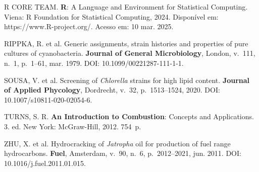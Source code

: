 R CORE TEAM. \textbf{R}: A Language and Environment for Statistical Computing. Viena: R Foundation for Statistical Computing, 2024. Disponível em: https://www.R-project.org/. Acesso em: 10 mar. 2025.

RIPPKA, R. et al. Generic assignments, strain histories and properties of pure cultures of cyanobacteria. \textbf{Journal of General Microbiology}, London, v.~111, n.~1, p.~1--61, mar. 1979. DOI: 10.1099/00221287-111-1-1.

SOUSA, V. et al. Screening of \textit{Chlorella} strains for high lipid content. \textbf{Journal of Applied Phycology}, Dordrecht, v.~32, p.~1513--1524, 2020. DOI: 10.1007/s10811-020-02054-6.

TURNS, S. R. \textbf{An Introduction to Combustion}: Concepts and Applications. 3. ed. New York: McGraw-Hill, 2012. 754~p.

ZHU, X. et al. Hydrocracking of \textit{Jatropha} oil for production of fuel range hydrocarbons. \textbf{Fuel}, Amsterdam, v.~90, n.~6, p.~2012--2021, jun. 2011. DOI: 10.1016/j.fuel.2011.01.015.

\endgroup

